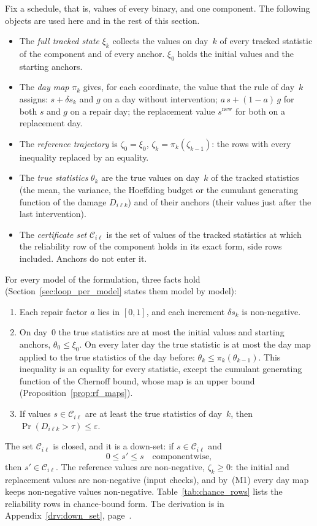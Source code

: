 \documentclass[11pt,a4paper]{article}
\theoremstyle{plain}
\theoremstyle{definition}
\theoremstyle{remark}
\begin{document}
Fix a schedule, that is, values of every binary, and one component.
The following objects are used here and in the rest of this section.
\begin{itemize}
  \item The \emph{full tracked state} $\xi_k$ collects the values on day~$k$ of every tracked statistic of the component and of every anchor.
    $\xi_0$ holds the initial values and the starting anchors.
  \item The \emph{day map} $\pi_k$ gives, for each coordinate, the value that the rule of day~$k$ assigns: $s + \delta s_k$ and $g$ on a day without intervention; $a\,s + (1-a)\,g$ for both $s$ and $g$ on a repair day; the replacement value $s^{\mathrm{new}}$ for both on a replacement day.
  \item The \emph{reference trajectory} is $\zeta_0 = \xi_0$, $\zeta_k = \pi_k(\zeta_{k-1})$: the rows with every inequality replaced by an equality.
  \item The \emph{true statistics} $\theta_k$ are the true values on day~$k$ of the tracked statistics (the mean, the variance, the Hoeffding budget or the cumulant generating function of the damage $D_{i\ell k}$) and of their anchors (their values just after the last intervention).
  \item The \emph{certificate set} $\mathcal{C}_{i\ell}$ is the set of values of the tracked statistics at which the reliability row of the component holds in its exact form, side rows included.
    Anchors do not enter it.
\end{itemize}

For every model of the formulation, three facts hold (Section~\ref{sec:loop_per_model} states them model by model):
\begin{enumerate}[label=(M\arabic*)]
  \item Each repair factor $a$ lies in $[0,1]$, and each increment $\delta s_k$ is non-negative.
  \item On day~$0$ the true statistics are at most the initial values and starting anchors, $\theta_0 \le \xi_0$.
    On every later day the true statistic is at most the day map applied to the true statistics of the day before: $\theta_k \le \pi_k(\theta_{k-1})$.
    This inequality is an equality for every statistic, except the cumulant generating function of the Chernoff bound, whose map is an upper bound (Proposition~\ref{prop:rf_maps}).
  \item If values $s \in \mathcal{C}_{i\ell}$ are at least the true statistics of day~$k$, then $\Pr(D_{i\ell k} > \tau) \le \varepsilon$.
\end{enumerate}
The set $\mathcal{C}_{i\ell}$ is closed, and it is a down-set: if $s \in \mathcal{C}_{i\ell}$ and
\begin{equation}
  0 \le s' \le s \quad \text{componentwise},
\end{equation}
then $s' \in \mathcal{C}_{i\ell}$.
The reference values are non-negative, $\zeta_k \ge 0$: the initial and replacement values are non-negative (input checks), and by~(M1) every day map keeps non-negative values non-negative.
Table~\ref{tab:chance_rows} lists the reliability rows in chance-bound form.
The derivation is in Appendix~\ref{drv:down_set}, page~\pageref{drv:down_set}.
\end{document}

